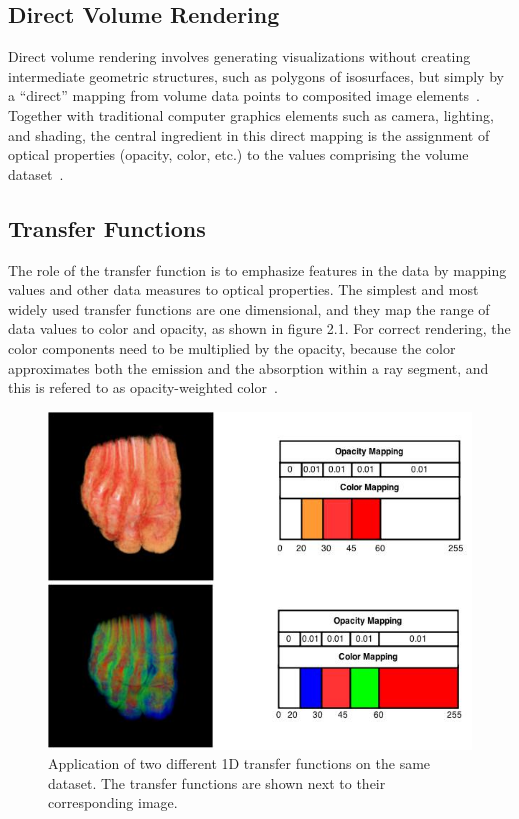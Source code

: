 \subsection{Direct Volume Rendering}
Direct volume rendering involves generating visualizations without creating intermediate geometric structures, such as polygons of isosurfaces, but simply by a “direct” mapping from volume data points to composited image elements~\cite{Robert:1992}.
Together with traditional computer graphics elements such as camera, lighting, and shading, the central ingredient in this direct mapping is the assignment of optical properties (opacity, color, etc.) to the values comprising the volume dataset~\cite{bar}.



\subsection{Transfer Functions}
The role of the transfer function is to emphasize features in the data by mapping values and other data measures to optical properties. The simplest and most widely used transfer functions are one dimensional, and they map the range of data values to color and opacity, as shown in figure 2.1. For correct rendering, the color components need to be multiplied by the opacity, because the color approximates both the emission and the absorption within a ray segment, and this is refered to as opacity-weighted color~\cite{Wittenbrink98opacity-weightedcolor}. 

\begin{figure}[!h]
\centering
\includegraphics[width=350pt]{Images/foot_different_TF.jpg}
\caption{\label{fig:ray_cast1.jpg} Application of two different 1D transfer
functions on the same dataset. The transfer functions are shown next to their corresponding image.}
\end{figure} 


